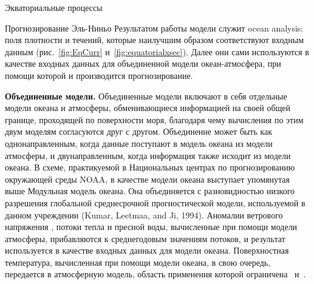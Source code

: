 \begin{chapter}{Экваториальные процессы}
\begin{section}{Прогнозирование Эль-Ниньо}
Результатом работы модели служит ocean analysis: поля плотности и течений, 
которые наилучшим образом соответствуют входным данным
(рис.~\ref{fig:EqCurr} и~\ref{fig:equatorialxsec}). Далее они сами используются
в качестве входных данных для объединенной модели океан-атмосфера, при помощи
которой и производится прогнозирование.
%

\textbf{Объединенные модели.} Объединенные модели%
%
%
включают в себя отдельные модели океана и атмосферы, обменивающиеся информацией
на своей общей границе, проходящей по поверхности моря, благодаря чему
вычисления по этим двум моделям согласуются друг с другом. Объединение может
быть как однонаправленным, когда данные поступают в модель океана из модели
атмосферы, и двунаправленным, когда информация также исходит из модели океана.
В схеме, практикуемой в Национальных центрах по прогнозированию 
окружающей среды NOAA, в качестве модели океана выступает упомянутая выше
Модульная модель океана. Она объединяется с разновидностью низкого разрешения 
глобальной среднесрочной прогностической модели, используемой в данном 
учреждении (Kumar, Leetmaa, and Ji, 1994). 
Аномалии ветрового напряжения%
, потоки тепла и пресной воды, вычисленные
при помощи модели атмосферы, прибавляются к среднегодовым значениям потоков,
и результат используется в качестве входных данных для модели океана. 
Поверхностная температура, вычисленная при помощи модели океана, в свою
очередь, передается в атмосферную модель, область применения которой
ограничена~ и~.
%


\end{section}
\end{chapter}
